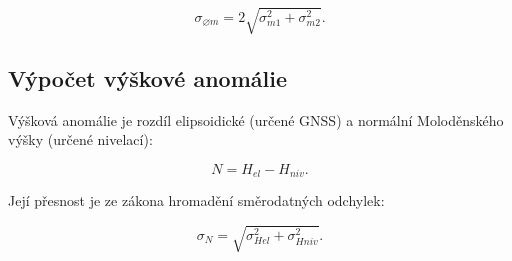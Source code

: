 \begin{equation}
    \sigma_{\varnothing m}=2\sqrt{\sigma_{m1}^2+\sigma_{m2}^2}.
\end{equation}

\subsection{Výpočet výškové anomálie}

\tab Výšková anomálie je rozdíl elipsoidické (určené GNSS) a normální Moloděnského výšky (určené nivelací): 

\begin{equation}
    N=H_{el}-H_{niv}.
\end{equation}

Její přesnost je ze zákona hromadění směrodatných odchylek:

\begin{equation}
    \sigma_N=\sqrt{\sigma_{Hel}^2+\sigma_{Hniv}^2}.
\end{equation}

